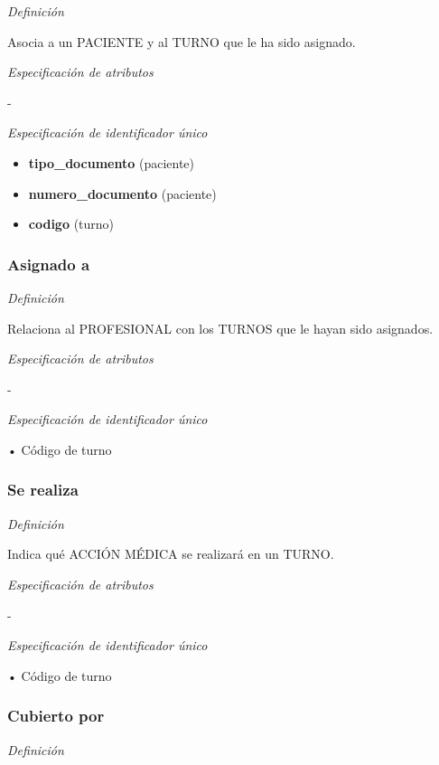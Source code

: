 \documentclass[a4paper,11pt]{article}
\begin{document}
\textit{Definición}

Asocia a un PACIENTE y al TURNO que le ha sido asignado.

\textit{Especificación de atributos}

-

\textit{Especificación de identificador único}

\begin{itemize}

     \item \textbf{tipo\_documento} (paciente)

     \item \textbf{numero\_documento} (paciente)

     \item \textbf{codigo} (turno)

\end{itemize}

\subsubsection{\textbf{Asignado a}}

\textit{Definición}

Relaciona al PROFESIONAL con los TURNOS que le hayan sido asignados.

\textit{Especificación de atributos}

-

\textit{Especificación de identificador único}

• Código de turno\label{HToc293405821}

\subsubsection{\textbf{Se realiza}}

\textit{Definición}

Indica qué ACCIÓN MÉDICA se realizará en un TURNO.

\textit{Especificación de atributos}

-

\textit{Especificación de identificador único}

• Código de turno\label{HToc293405822}

\subsubsection{\textbf{Cubierto por}}

\textit{Definición}
\end{document}
